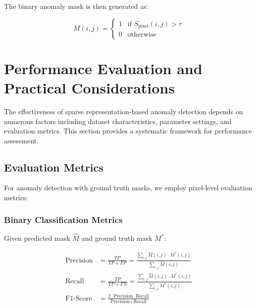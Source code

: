 \documentclass[12pt]{article}
\begin{document}
The binary anomaly mask is then generated as:

\begin{equation}
    \label{eq:final_mask}
    M(i,j) = \begin{cases}
        1 & \text{if } S_{\text{pixel}}(i,j) > \tau \\
        0 & \text{otherwise}
    \end{cases}
\end{equation}

\newpage

\section{Performance Evaluation and Practical Considerations}
\label{sec:evaluation}

The effectiveness of sparse representation-based anomaly detection depends on numerous factors including dataset characteristics, parameter settings, and evaluation metrics. This section provides a systematic framework for performance assessment.

\subsection{Evaluation Metrics}
\label{subsec:metrics}

For anomaly detection with ground truth masks, we employ pixel-level evaluation metrics:

\subsubsection{Binary Classification Metrics}
\label{subsubsec:binary_metrics}

Given predicted mask $\hat{M}$ and ground truth mask $M^*$:

\begin{align}
    \text{Precision} & = \frac{TP}{TP + FP} = \frac{\sum_{i,j} \hat{M}(i,j) \cdot M^*(i,j)}{\sum_{i,j} \hat{M}(i,j)} \label{eq:precision} \\
    \text{Recall}    & = \frac{TP}{TP + FN} = \frac{\sum_{i,j} \hat{M}(i,j) \cdot M^*(i,j)}{\sum_{i,j} M^*(i,j)} \label{eq:recall}        \\
    \text{F1-Score}  & = \frac{2 \cdot \text{Precision} \cdot \text{Recall}}{\text{Precision} + \text{Recall}} \label{eq:f1}
\end{align}
\end{document}
